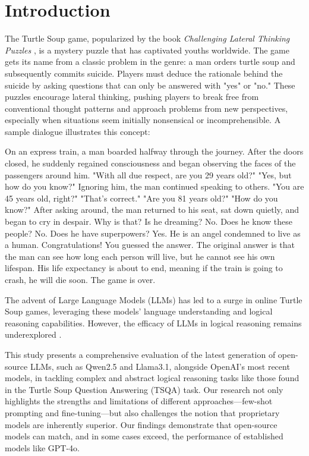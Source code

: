 \section{Introduction}

The Turtle Soup game, popularized by the book \textit{Challenging Lateral Thinking Puzzles} \cite{sloane1993challenging}, is a mystery puzzle that has captivated youths worldwide. The game gets its name from a classic problem in the genre: a man orders turtle soup and subsequently commits suicide. Players must deduce the rationale behind the suicide by asking questions that can only be answered with "yes" or "no." These puzzles encourage lateral thinking, pushing players to break free from conventional thought patterns and approach problems from new perspectives, especially when situations seem initially nonsensical or incomprehensible. A sample dialogue illustrates this concept:

\small{
\begin{dialogue}
 On an express train, a man boarded halfway through the journey. After the doors closed, he suddenly regained consciousness and began observing the faces of the passengers around him. "With all due respect, are you 29 years old?" "Yes, but how do you know?" Ignoring him, the man continued speaking to others. "You are 45 years old, right?" "That's correct." "Are you 81 years old?" "How do you know?" After asking around, the man returned to his seat, sat down quietly, and began to cry in despair. Why is that?
 Is he dreaming?
 No.
 Does he know these people?
 No.
 Does he have superpowers?
 Yes.
 He is an angel condemned to live as a human.
 Congratulations! You guessed the answer. The original answer is that the man can see how long each person will live, but he cannot see his own lifespan. His life expectancy is about to end, meaning if the train is going to crash, he will die soon. The game is over.
\end{dialogue}
}

The advent of Large Language Models (LLMs) has led to a surge in online Turtle Soup games, leveraging these models' language understanding and logical reasoning capabilities. However, the efficacy of LLMs in logical reasoning remains underexplored \cite{parmar2024logicbench}.

This study presents a comprehensive evaluation of the latest generation of open-source LLMs, such as Qwen2.5 and Llama3.1, alongside OpenAI's most recent models, in tackling complex and abstract logical reasoning tasks like those found in the Turtle Soup Question Answering (TSQA) task. Our research not only highlights the strengths and limitations of different approaches—few-shot prompting and fine-tuning—but also challenges the notion that proprietary models are inherently superior. Our findings demonstrate that open-source models can match, and in some cases exceed, the performance of established models like GPT-4o.

